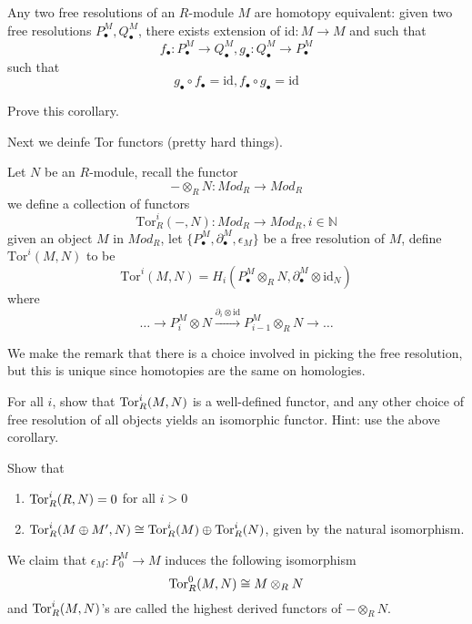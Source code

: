 \begin{cor}
    Any two free resolutions of an $R$-module $M$ are homotopy equivalent: given two free resolutions $P_\bullet^M, Q_\bullet^M$, there exists extension of $\text{id}: M\to M$ and such that 
    \begin{equation*}
        f_\bullet: P_\bullet^M\to Q_\bullet^M, g_\bullet: Q_\bullet^M\to P_\bullet^M
    \end{equation*}
    such that 
    \begin{equation*}
        g_\bullet\circ f_\bullet= \text{id}, f_\bullet\circ g_\bullet= \text{id}
    \end{equation*}
\end{cor}
\begin{prob}[HW(2.1)]
    Prove this corollary.
\end{prob}
Next we deinfe Tor functors (pretty hard things). 
\begin{defn}
    Let $N$ be an $R$-module, recall the functor 
    \begin{equation*}
        -\otimes_RN: Mod_R\to Mod_R
    \end{equation*}
    we define a collection of functors 
    \begin{equation*}
        \text{Tor}_R^i(-,N): Mod_R\to Mod_R, i\in\mathbb{N}
    \end{equation*}
    given an object $M$ in $Mod_R$, let $\{P_\bullet^M, \partial_\bullet^M, \epsilon_M\}$ be a free resolution of $M$, define $\text{Tor}^i(M,N)$ to be 
    \begin{equation*}
        \text{Tor}^i(M,N)=H_i(P_\bullet^M\otimes_RN, \partial_\bullet^M\otimes\text{id}_N)
    \end{equation*}
    where 
    \begin{equation*}
        \dots\to P_i^M\otimes N\xrightarrow{\partial_i\otimes\text{id}}P_{i-1}^M\otimes_RN\to\dots
    \end{equation*}
\end{defn}
We make the remark that there is a choice involved in picking the free resolution, but this is unique since homotopies are the same on homologies.
\begin{prob}[HW(2.2)]
    For all $i$, show that  $\text{Tor}_R^i(M,N)$ is a well-defined functor, and any other choice of free resolution of all objects yields an isomorphic functor. Hint: use the above corollary.
\end{prob}
\begin{prob}[HW(2.3)]
    Show that 
    \begin{enumerate}
        \item $\text{Tor}_R^i(R,N)=0$ for all $i>0$
        \item $\text{Tor}_R^i(M\oplus M', N)\cong\text{Tor}_R^i(M)\oplus\text{Tor}_R^i(N)$, given by the natural isomorphism.
    \end{enumerate}
\end{prob}
We claim that $\epsilon_M:P_0^M\to M$ induces the following isomorphism
\begin{equation*}
    \text{Tor}_R^0(M,N)\cong M\otimes_RN
\end{equation*}
and $\text{Tor}_R^i(M,N)$'s are called the highest derived functors of $-\otimes_RN$.

